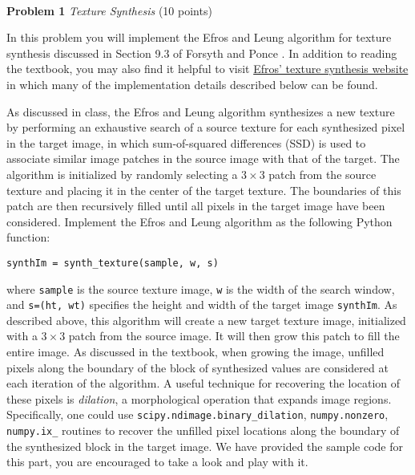 \documentclass[11pt]{article}
\newcommand{\hwproblem}[2] {\noindent \\ {\bf #1} {\it #2}}
\begin{document}
\hwproblem{Problem 1}{Texture Synthesis}  (10 points)

In this problem you will implement the Efros and Leung algorithm  for texture synthesis \cite{efros1999texture} discussed in Section 9.3 of Forsyth and Ponce \cite{forsyth2012computer}. In addition to reading the textbook, you may also find it helpful to visit
\href{http://graphics.cs.cmu.edu/people/efros/research/synthesis.html} {Efros' texture synthesis website} in which many of the implementation details described below can be found. 

As discussed in class, the Efros and Leung algorithm synthesizes a new texture by performing an exhaustive search of a source texture for each synthesized pixel in the target image, in which sum-of-squared differences (SSD) is used to associate similar image patches in the source image with that of the target. The algorithm is initialized by randomly selecting a $3 \times 3$ patch from the source texture and placing it in the center of the target texture. The boundaries of this patch are then recursively filled until all pixels in the target image have been considered. Implement the Efros and Leung algorithm as the following Python function:
\vspace{-0.1in}
\begin{center}\texttt{synthIm = synth\_texture(sample, w, s)}\end{center}

where \texttt{sample} is the source texture image, \texttt{w} is the width of the search window, and \texttt{s=(ht, wt)} specifies the height and width of the target image \texttt{synthIm}. As described above, this algorithm will create a new target texture image, initialized with a $3 \times 3$ patch from the source image. It will then grow this patch to fill the entire image. As discussed in the textbook, when growing the image, unfilled pixels along the boundary of the block of synthesized values are considered at
each iteration of the algorithm. A useful technique for recovering the location of these pixels is \emph{dilation}, a morphological operation that expands image regions. Specifically, one could use \texttt{scipy.ndimage.binary\_dilation}, \texttt{numpy.nonzero}, \texttt{numpy.ix\_} routines to recover the unfilled pixel locations along the boundary of the synthesized block in the target image. We have provided the sample code for this part, you are encouraged to take a look and play with it.
\end{document}
